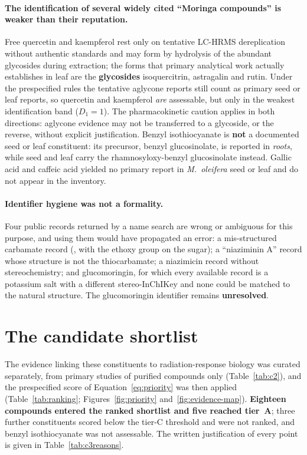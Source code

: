 \paragraph{The identification of several widely cited \enquote{Moringa compounds} is weaker
than their reputation.} Free quercetin and kaempferol rest only on tentative LC-HRMS
dereplication without authentic standards and may form by hydrolysis of the abundant
glycosides during extraction; the forms that primary analytical work actually establishes in
leaf are the \textbf{glycosides} isoquercitrin, astragalin and rutin. Under the prespecified
rules the tentative aglycone reports still count as primary seed or leaf reports, so
quercetin and kaempferol \emph{are} assessable, but only in the weakest identification band
($D_1=1$). The pharmacokinetic caution applies in both directions: aglycone evidence may not
be transferred to a glycoside, or the reverse, without explicit justification. Benzyl
isothiocyanate is \textbf{not} a documented seed or leaf constituent: its precursor, benzyl
glucosinolate, is reported in \emph{roots}, while seed and leaf carry the
rhamnosyloxy-benzyl glucosinolate instead. Gallic acid and caffeic acid yielded no primary
report in \textit{M.~oleifera} seed or leaf and do not appear in the inventory.

\paragraph{Identifier hygiene was not a formality.} Four public records returned by a name
search are wrong or ambiguous for this purpose, and using them would have propagated an
error: a mis-structured carbamate record (, with the ethoxy group on the
sugar); a \enquote{niaziminin A} record whose structure is not the thiocarbamate; a
niazimicin record without stereochemistry; and glucomoringin, for which every available
record is a potassium salt with a different stereo-InChIKey and none could be matched to the
natural structure. The glucomoringin identifier remains \textbf{unresolved}.

\section{The candidate shortlist}\label{sec:shortlist}

The evidence linking these constituents to radiation-response biology was curated
separately, from primary studies of purified compounds only (Table~\ref{tab:c2}), and the
prespecified score of Equation~\ref{eq:priority} was then applied
(Table~\ref{tab:ranking}; Figures~\ref{fig:priority} and~\ref{fig:evidence-map}).
\textbf{Eighteen compounds entered the ranked shortlist and five reached tier~A}; three
further constituents scored below the tier-C threshold and were not ranked, and benzyl
isothiocyanate was not assessable. The written justification of every point is given in
Table~\ref{tab:c3reasons}.

